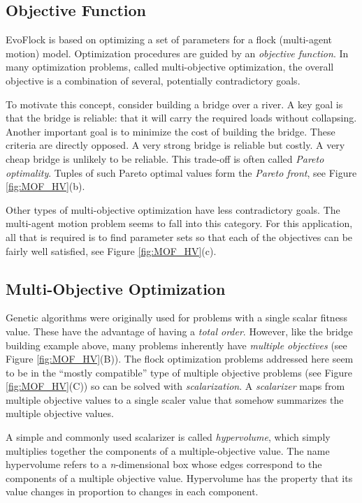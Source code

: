 \documentclass[letterpaper]{article}
\begin{document}
\subsection{Objective Function}
\label{subsec:ObjectiveFunction}

EvoFlock is based on optimizing a set of parameters for a flock (multi-agent motion) model. Optimization procedures are guided by an \textit{objective function}. In many optimization problems, called multi-objective optimization, the overall objective is a combination of several, potentially contradictory goals. 

To motivate this concept, consider building a bridge over a river. A key goal is that the bridge is reliable: that it will carry the required loads without collapsing. Another important goal is to minimize the cost of building the bridge. These criteria are directly opposed. A very strong bridge is reliable but costly. A very cheap bridge is unlikely to be reliable. This trade-off is often called \textit{Pareto optimality}. Tuples of such Pareto optimal values form the \textit{Pareto front}, see Figure \ref{fig:MOF_HV}(b).

Other types of multi-objective optimization have less contradictory goals. The multi-agent motion problem seems to fall into this category. For this application, all that is required is to find parameter sets so that each of the objectives can be fairly well satisfied, see Figure \ref{fig:MOF_HV}(c).


\subsection{Multi-Objective Optimization}
\label{subsec:Multi-Objective}

Genetic algorithms were originally used for problems with a single scalar fitness value. These have the advantage of having a \textit{total order}. However, like the bridge building example above, many problems inherently have \textit{multiple objectives} (see Figure \ref{fig:MOF_HV}(B)). The flock optimization problems addressed here seem to be in the ``mostly compatible'' type of multiple objective problems (see Figure \ref{fig:MOF_HV}(C)) so can be solved with \textit{scalarization}. A \textit{scalarizer} maps from multiple objective values to a single scaler value that somehow summarizes the multiple objective values.

A simple and commonly used scalarizer is called \textit{hypervolume}, which simply multiplies together the components of a multiple-objective value. The name hypervolume refers to a \textit{n}-dimensional box whose edges correspond to the components of a multiple objective value. Hypervolume has the property that its value changes in proportion to changes in each component.
\end{document}
